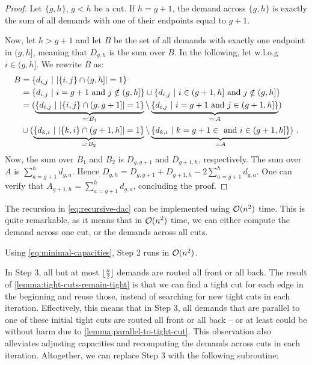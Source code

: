 \begin{proof}
	Let $\{g, h\}$, $g < h$ be a cut.
	If $h = g+1$, the demand across $\{g, h\}$ is exactly the sum of all demands with one of their endpoints equal to $g+1$.
	
	Now, let $h > g+1$ and let $B$ be the set of all demands with exactly one endpoint in $(g, h]$, meaning that $D_{g, h}$ is the sum over $B$.	
	In the following, let w.l.o.g $i \in (g, h]$.
	We rewrite $B$ as: 
	\begin{align}
		B &= \{d_{i, j}\ |\ \abs{\{i, j\} \cap (g, h]} = 1\} \\
 		&=\{d_{i, j}\ |\ i = g+1 \text{ and } j \notin(g, h]\} \cup \{d_{i, j}\ |\ i \in (g+1, h] \text{ and } j \notin(g, h]\} \\
		&= (\underbrace{\{d_{i, j}\ |\ \abs{\{i, j\} \cap (g, g+1]} = 1\}}_{\eqqcolon B_1} \setminus \underbrace{\{d_{i, j}\ |\ i = g+1 \text{ and } j \in (g+1, h]\}}_{\eqqcolon A})\\
		& \cup
			(\underbrace{\{d_{k, i}\ |\ \abs{\{k, i\} \cap (g+1, h]} = 1 \}}_{\eqqcolon B_2} \setminus \underbrace{\{d_{k, i}\ |\ k = g+1 \in  \text{ and } i \in (g+1, h]\}}_{= A}) \ .
	\end{align}
	Now, the sum over $B_1$ and $B_2$ is $D_{g, g+1}$ and $D_{g+1, h}$, respectively.
	The sum over $A$ is $\sum_{a = g+1}^h d_{g, a}$.
	Hence $D_{g, h} = D_{g, g+1} + D_{g+1, h} - 2 \sum_{a = g+1}^h d_{g, a}$.
	One can verify that $A_{g+1, h} = \sum_{a = g+1}^h d_{g, a}$, concluding the proof.
\end{proof}
The recursion in \cref{eq:recursive-dac} can be implemented using $\mathcal{O}(n^2)$ time.
This is quite remarkable, as it means that in $\mathcal{O}(n^2)$ time, we can either compute the demand across one cut, or the demands across all cuts.

Using \cref{eq:minimal-capacities}, Step 2 runs in $\mathcal{O}(n^2)$.

In Step 3, all but at most $\lfloor \frac{n}{2} \rfloor$ demands are routed all front or all back.
The result of \cref{lemma:tight-cuts-remain-tight} is that we can find a tight cut for each edge in the beginning and reuse those, instead of searching for new tight cuts in each iteration.
Effectively, this means that in Step 3, all demands that are parallel to one of these initial tight cuts are routed all front or all back -- or at least could be without harm due to \cref{lemma:parallel-to-tight-cut}.
This observation also alleviates adjusting capacities and recomputing the demands across cuts in each iteration.
Altogether, we can replace Step 3 with the following subroutine:

